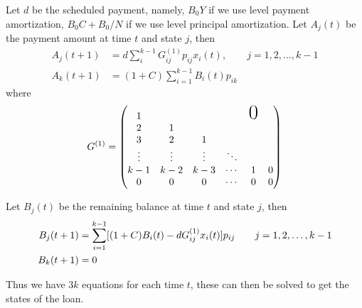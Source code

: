 Let $d$ be the scheduled payment, namely, $B_0 Y$ if we use level payment
amortization, $B_0 C + B_0 / N$ if we use level principal amortization.
Let $A_j(t)$ be the payment amount at time $t$ and state $j$, then
\begin{align}
  A_j(t+1) &= d \sum_i^{k-1} G_{ij}^{(1)} p_{ij} x_i(t), \qquad j=1,2,\dots,k-1 \\
  A_{k}(t+1) &= (1+C) \sum_{i=1}^{k-1} B_i(t) p_{ik}
\end{align}
where
\begin{equation}
  G^{(1)} =
  \begin{pmatrix}
    1      &        &        &        & \text{\huge0} \\
    2      & 1      &        &        &        \\
    3      & 2      & 1      &        &        \\
    \vdots & \vdots & \vdots & \ddots &   &   \\
    k-1    & k-2    & k-3    & \cdots & 1 & 0 \\
    0      & 0      & 0      & \cdots & 0 & 0
  \end{pmatrix}
\end{equation}

Let $B_j(t)$ be the remaining balance at time $t$ and state $j$, then
\begin{align}
  B_j(t+1) &= \sum_{i=1}^{k-1} [(1+C) B_i(t) - d G_{ij}^{(1)} x_i(t)] p_{ij}
       \qquad j=1,2,\dots,k-1  \notag \\ 
  B_k(t+1) &= 0
\end{align}

Thus we have $3k$ equations for each time $t$, these can then be solved to get
the states of the loan.

